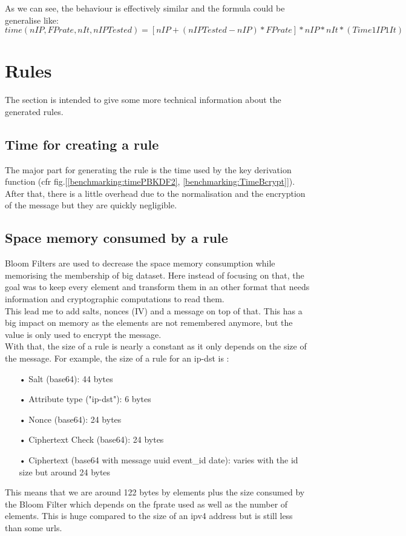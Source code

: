 \documentclass{eplmastersthesis}
\begin{document}
As we can see, the behaviour is effectively similar and the formula could be generalise like:
$$time(nIP, FPrate, nIt, nIPTested)=\left[nIP+(nIPTested-nIP)*FPrate\right]*nIP*nIt*(Time1IP1It)$$

\section{Rules}

The section is intended to give some more technical information about the generated rules.

\subsection{Time for creating a rule}
The major part for generating the rule is the time used by the key derivation function (cfr fig.[\ref{benchmarking:timePBKDF2}, \ref{benchmarking:TimeBcrypt}]). After that, there is a little overhead due to the normalisation and the encryption of the message but they are quickly negligible.\\

\subsection{Space memory consumed by a rule}
Bloom Filters are used to decrease the space memory consumption while memorising the membership of big dataset. Here instead of focusing on that, the goal was to keep every element and transform them in an other format that needs information and cryptographic computations to read them.\\

This lead me to add salts, nonces (IV) and a message on top of that. This has a big impact on memory as the elements are not remembered anymore, but the value is only used to encrypt the message.\\

With that, the size of a rule is nearly a constant as it only depends on the size of the message. For example, the size of a rule for an ip-dst is :
\begin{itemize}
\item[•] Salt (base64): 44 bytes
\item[•] Attribute type ("ip-dst"): 6 bytes
\item[•] Nonce (base64): 24 bytes
\item[•] Ciphertext Check (base64): 24 bytes
\item[•] Ciphertext (base64 with message uuid event\_id date): varies with the id size but around 24 bytes
\end{itemize}
This means that we are around 122 bytes by elements plus the size consumed by the Bloom Filter which depends on the \gls{fp}rate used as well as the number of elements. This is huge compared to the size of an \gls{ipv4} address but is still less than some \gls{url}s.
\end{document}
